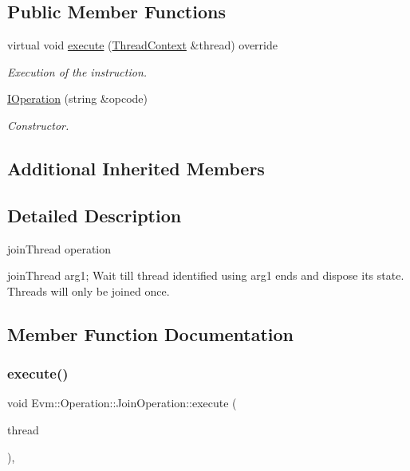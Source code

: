 \subsection*{Public Member Functions}
\begin{DoxyCompactItemize}
\item 
virtual void \mbox{\hyperlink{struct_evm_1_1_operation_1_1_join_operation_a55e6e5eb220d3ed0b659d085a7aa6df8}{execute}} (\mbox{\hyperlink{struct_evm_1_1_thread_context}{Thread\+Context}} \&thread) override
\begin{DoxyCompactList}\small\item\em Execution of the instruction. \end{DoxyCompactList}\item 
\mbox{\hyperlink{struct_evm_1_1_operation_1_1_join_operation_a65e98ee1b1679e12c1d1dd000ebfe937}{I\+Operation}} (string \&opcode)
\begin{DoxyCompactList}\small\item\em Constructor. \end{DoxyCompactList}\end{DoxyCompactItemize}
\subsection*{Additional Inherited Members}


\subsection{Detailed Description}
join\+Thread operation 

join\+Thread arg1; Wait till thread identified using arg1 ends and dispose its state. Threads will only be joined once. 

\subsection{Member Function Documentation}
\mbox{\label{struct_evm_1_1_operation_1_1_join_operation_a55e6e5eb220d3ed0b659d085a7aa6df8}} 
\subsubsection{\texorpdfstring{execute()}{execute()}}
{\footnotesize\ttfamily void Evm\+::\+Operation\+::\+Join\+Operation\+::execute (\begin{DoxyParamCaption}\item[{\mbox{\hyperlink{struct_evm_1_1_thread_context}{Thread\+Context}} \&}]{thread }\end{DoxyParamCaption})\hspace{0.3cm}{\ttfamily [override]}, {\ttfamily [virtual]}}



